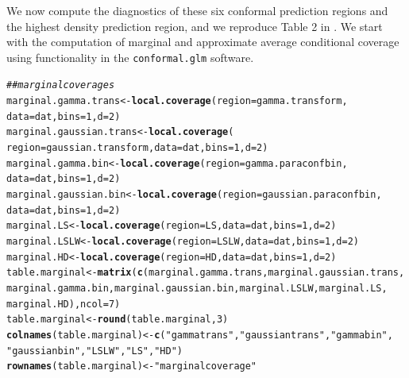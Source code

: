 \documentclass[11pt]{article}\usepackage[]{graphicx}\usepackage[]{color}
\makeatletter
\newcommand{\hlnum}[1]{\textcolor[rgb]{0.686,0.059,0.569}{#1}}%
\newcommand{\hlstr}[1]{\textcolor[rgb]{0.192,0.494,0.8}{#1}}%
\newcommand{\hlcom}[1]{\textcolor[rgb]{0.678,0.584,0.686}{\textit{#1}}}%
\newcommand{\hlstd}[1]{\textcolor[rgb]{0.345,0.345,0.345}{#1}}%
\newcommand{\hlkwb}[1]{\textcolor[rgb]{0.69,0.353,0.396}{#1}}%
\newcommand{\hlkwc}[1]{\textcolor[rgb]{0.333,0.667,0.333}{#1}}%
\newcommand{\hlkwd}[1]{\textcolor[rgb]{0.737,0.353,0.396}{\textbf{#1}}}%
\newenvironment{kframe}{%
 \def\at@end@of@kframe{}%
 \ifinner\ifhmode%
  \def\at@end@of@kframe{\end{minipage}}%
  \begin{minipage}{\columnwidth}%
 \fi\fi%
 \def\FrameCommand##1{\hskip\@totalleftmargin \hskip-\fboxsep
 \colorbox{shadecolor}{##1}\hskip-\fboxsep
     \hskip-\linewidth \hskip-\@totalleftmargin \hskip\columnwidth}%
 \MakeFramed {\advance\hsize-\width
   \@totalleftmargin\z@ \linewidth\hsize
   \@setminipage}}%
 {\par\unskip\endMakeFramed%
 \at@end@of@kframe}
\newenvironment{knitrout}{}{} %
\makeatother
\begin{document}
We now compute the diagnostics of these six conformal prediction 
regions and the highest density prediction region, and we reproduce 
Table 2 in \citet{eck2019conformal}.  
We start with the computation of marginal and approximate average 
conditional coverage using functionality in the \texttt{conformal.glm} 
software.


\begin{knitrout}
\color{fgcolor}\begin{kframe}
\begin{alltt}
\hlcom{## marginal coverages}
\hlstd{marginal.gamma.trans} \hlkwb{<-} \hlkwd{local.coverage}\hlstd{(}\hlkwc{region} \hlstd{= gamma.transform,}
  \hlkwc{data} \hlstd{= dat,} \hlkwc{bins} \hlstd{=} \hlnum{1}\hlstd{,} \hlkwc{d} \hlstd{=} \hlnum{2}\hlstd{)}
\hlstd{marginal.gaussian.trans} \hlkwb{<-} \hlkwd{local.coverage}\hlstd{(}
  \hlkwc{region} \hlstd{= gaussian.transform,} \hlkwc{data} \hlstd{= dat,} \hlkwc{bins} \hlstd{=} \hlnum{1}\hlstd{,} \hlkwc{d} \hlstd{=} \hlnum{2}\hlstd{)}
\hlstd{marginal.gamma.bin} \hlkwb{<-} \hlkwd{local.coverage}\hlstd{(}\hlkwc{region} \hlstd{= gamma.paraconfbin,}
  \hlkwc{data} \hlstd{= dat,} \hlkwc{bins} \hlstd{=} \hlnum{1}\hlstd{,} \hlkwc{d} \hlstd{=} \hlnum{2}\hlstd{)}
\hlstd{marginal.gaussian.bin} \hlkwb{<-} \hlkwd{local.coverage}\hlstd{(}\hlkwc{region} \hlstd{= gaussian.paraconfbin,}
  \hlkwc{data} \hlstd{= dat,} \hlkwc{bins} \hlstd{=} \hlnum{1}\hlstd{,} \hlkwc{d} \hlstd{=} \hlnum{2}\hlstd{)}
\hlstd{marginal.LS} \hlkwb{<-} \hlkwd{local.coverage}\hlstd{(}\hlkwc{region} \hlstd{= LS,} \hlkwc{data} \hlstd{= dat,} \hlkwc{bins} \hlstd{=} \hlnum{1}\hlstd{,} \hlkwc{d} \hlstd{=} \hlnum{2}\hlstd{)}
\hlstd{marginal.LSLW} \hlkwb{<-} \hlkwd{local.coverage}\hlstd{(}\hlkwc{region} \hlstd{= LSLW,} \hlkwc{data} \hlstd{= dat,} \hlkwc{bins} \hlstd{=} \hlnum{1}\hlstd{,} \hlkwc{d} \hlstd{=} \hlnum{2}\hlstd{)}
\hlstd{marginal.HD} \hlkwb{<-} \hlkwd{local.coverage}\hlstd{(}\hlkwc{region} \hlstd{= HD,} \hlkwc{data} \hlstd{= dat,} \hlkwc{bins} \hlstd{=} \hlnum{1}\hlstd{,} \hlkwc{d} \hlstd{=} \hlnum{2}\hlstd{)}
\hlstd{table.marginal} \hlkwb{<-} \hlkwd{matrix}\hlstd{(}\hlkwd{c}\hlstd{(marginal.gamma.trans, marginal.gaussian.trans,}
  \hlstd{marginal.gamma.bin, marginal.gaussian.bin, marginal.LSLW, marginal.LS,}
  \hlstd{marginal.HD),} \hlkwc{ncol} \hlstd{=} \hlnum{7}\hlstd{)}
\hlstd{table.marginal} \hlkwb{<-} \hlkwd{round}\hlstd{(table.marginal,} \hlnum{3}\hlstd{)}
\hlkwd{colnames}\hlstd{(table.marginal)} \hlkwb{<-} \hlkwd{c}\hlstd{(}\hlstr{"gamma trans"}\hlstd{,} \hlstr{"gaussian trans"}\hlstd{,} \hlstr{"gamma bin"}\hlstd{,}
  \hlstr{"gaussian bin"}\hlstd{,} \hlstr{"LSLW"}\hlstd{,} \hlstr{"LS"}\hlstd{,} \hlstr{"HD"}\hlstd{)}
\hlkwd{rownames}\hlstd{(table.marginal)} \hlkwb{<-} \hlstr{"marginal coverage"}


\end{alltt}
\end{kframe}
\end{knitrout}
\end{document}
